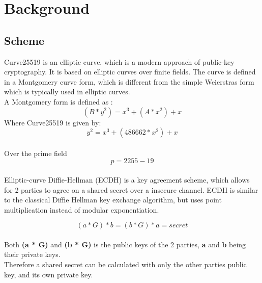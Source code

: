 %
\section{Background}
\subsection{Scheme}
Curve25519 is an elliptic curve, which is a modern approach of public-key cryptography. It is based on elliptic curves over finite fields.
The curve is defined in a Montgomery curve form, which is different from the simple Weierstras form which is typically used in elliptic curves.\\
A Montgomery form is defined as \cite{cryptobook}:\\
\[(B * y^2) = x^3 + (A * x^2) + x\]
Where Curve25519 is given by:\\
\[y^2 = x^3 + (486662 * x^2) + x\]\\
Over the prime field 
\[p = 2255 - 19\]\\
Elliptic-curve Diffie-Hellman (ECDH) is a key agreement scheme, which allows for 2 parties to agree on a shared secret over a insecure channel.
ECDH is similar to the classical Diffie Hellman key exchange algorithm, but uses point multiplication instead of modular exponentiation.

\[(a * G) * b = (b * G) * a = secret\]\\
Both \textbf{(a * G)} and \textbf{(b * G)} is the public keys of the 2 parties, \textbf{a} and \textbf{b} being their private keys.\\
Therefore a shared secret can be calculated with only the other parties public key, and its own private key.



\pagebreak

